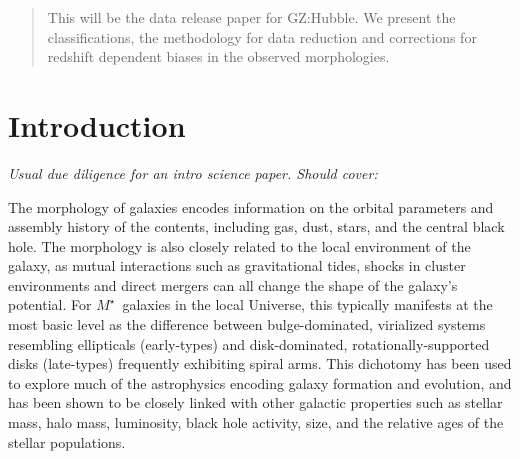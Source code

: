 \documentclass[usenatbib]{mn2e}
\begin{document}

\maketitle

\begin{abstract}

This will be the data release paper for GZ:Hubble. We present the classifications, the methodology for data reduction and corrections for redshift dependent biases in the observed morphologies. 

\end{abstract}


\section{Introduction}

\textit{Usual due diligence for an intro science paper. Should cover:}

The morphology of galaxies encodes information on the orbital parameters and assembly history of the contents, including gas, dust, stars, and the central black hole. The morphology is also closely related to the local environment of the galaxy, as mutual interactions such as gravitational tides, shocks in cluster environments and direct mergers can all change the shape of the galaxy's potential. For $M^\star$~galaxies in the local Universe, this typically manifests at the most basic level as the difference between bulge-dominated, virialized systems resembling ellipticals (early-types) and disk-dominated, rotationally-supported disks (late-types) frequently exhibiting spiral arms. This dichotomy has been used to explore much of the astrophysics encoding galaxy formation and evolution, and has been shown to be closely linked with other galactic properties such as stellar mass, halo mass, luminosity, black hole activity, size, and the relative ages of the stellar populations. 
\end{document}
